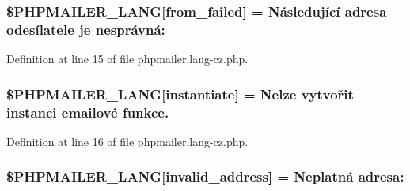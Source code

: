 \subsubsection[{\texorpdfstring{\$\+P\+H\+P\+M\+A\+I\+L\+E\+R\+\_\+\+L\+A\+NG}{$PHPMAILER_LANG}}]{\setlength{\rightskip}{0pt plus 5cm}\$P\+H\+P\+M\+A\+I\+L\+E\+R\+\_\+\+L\+A\+NG\mbox{[}\textquotesingle{}from\+\_\+failed\textquotesingle{}\mbox{]} = \textquotesingle{}Následující adresa odesílatele je nesprávná\+: \textquotesingle{}}\hypertarget{phpmailer_8lang-cz_8php_adf832ae12155a09be077c6d5e4fd7e22}{}\label{phpmailer_8lang-cz_8php_adf832ae12155a09be077c6d5e4fd7e22}


Definition at line 15 of file phpmailer.\+lang-\/cz.\+php.

\subsubsection[{\texorpdfstring{\$\+P\+H\+P\+M\+A\+I\+L\+E\+R\+\_\+\+L\+A\+NG}{$PHPMAILER_LANG}}]{\setlength{\rightskip}{0pt plus 5cm}\$P\+H\+P\+M\+A\+I\+L\+E\+R\+\_\+\+L\+A\+NG\mbox{[}\textquotesingle{}instantiate\textquotesingle{}\mbox{]} = \textquotesingle{}Nelze vytvořit instanci emailové funkce.\textquotesingle{}}\hypertarget{phpmailer_8lang-cz_8php_ad58dde16780f4770ccf4dd282ea1f5ad}{}\label{phpmailer_8lang-cz_8php_ad58dde16780f4770ccf4dd282ea1f5ad}


Definition at line 16 of file phpmailer.\+lang-\/cz.\+php.

\subsubsection[{\texorpdfstring{\$\+P\+H\+P\+M\+A\+I\+L\+E\+R\+\_\+\+L\+A\+NG}{$PHPMAILER_LANG}}]{\setlength{\rightskip}{0pt plus 5cm}\$P\+H\+P\+M\+A\+I\+L\+E\+R\+\_\+\+L\+A\+NG\mbox{[}\textquotesingle{}invalid\+\_\+address\textquotesingle{}\mbox{]} = \textquotesingle{}Neplatná adresa\+: \textquotesingle{}}\hypertarget{phpmailer_8lang-cz_8php_a42d61bcea4c79599ecb44fd062f54d47}{}\label{phpmailer_8lang-cz_8php_a42d61bcea4c79599ecb44fd062f54d47}


